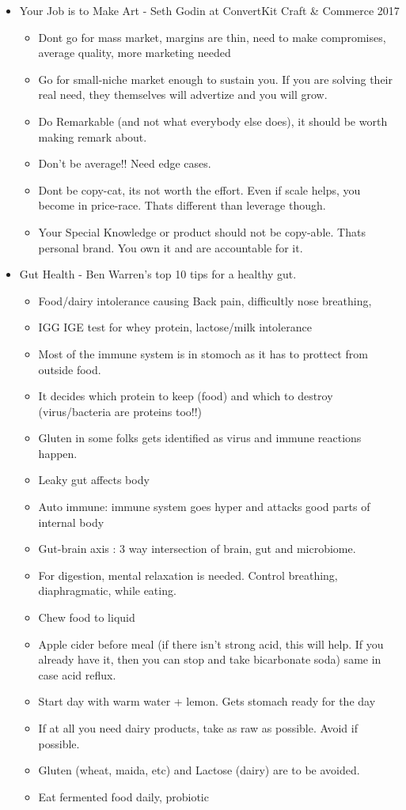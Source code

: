 \begin{itemize}[noitemsep,nolistsep]
\item Your Job is to Make Art - Seth Godin at ConvertKit Craft & Commerce 2017
 	\begin{itemize}[noitemsep,nolistsep]
	\item Dont go for mass market, margins are thin, need to make compromises, average quality, more marketing needed
	\item Go for small-niche market enough to sustain you. If you are solving their real need, they themselves will advertize and you will grow.
	\item Do Remarkable (and not what everybody else does), it should be worth making remark about.
	\item Don't be average!! Need edge cases.
	\item Dont be copy-cat, its not worth the effort. Even if scale helps, you become in price-race. Thats different than leverage though. 
	\item Your Special Knowledge or product should not be copy-able. Thats personal brand. You own it and are accountable for it.
	\end{itemize}
\item Gut Health - Ben Warren's top 10 tips for a healthy gut.
	\begin{itemize}[noitemsep,nolistsep]
	\item Food/dairy intolerance causing Back pain, difficultly nose breathing, 
	\item IGG IGE test for whey protein, lactose/milk intolerance
	\item Most of the immune system is in stomoch as it has to prottect from outside food.
	\item It decides which protein to keep (food) and which to destroy (virus/bacteria are proteins too!!)
	\item Gluten in some folks gets identified as virus and immune reactions happen.
	\item Leaky gut affects body
	\item Auto immune: immune system goes hyper and attacks good parts of internal body
	\item Gut-brain axis : 3 way intersection of brain, gut and microbiome.
	\item For digestion, mental relaxation is needed. Control breathing, diaphragmatic, while eating.
	\item Chew food to liquid
	\item Apple cider before meal (if there isn't strong acid, this will help. If you already have it, then you can stop and take bicarbonate soda) same in case acid reflux.
	\item Start day with warm water + lemon. Gets stomach ready for the day
	\item If at all you need dairy products, take as raw as possible. Avoid if possible.
	\item Gluten (wheat, maida, etc) and Lactose (dairy) are to be avoided.
	\item Eat fermented food daily, probiotic
	\end{itemize}
	

\end{itemize}

